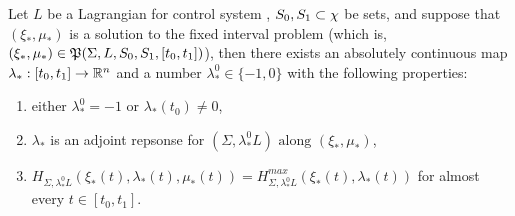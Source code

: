 \begin{teo}
	Let $L$ be a Lagrangian for control system \controlSystem, $S_0,S_1\subset\chi$ be sets, and suppose that $(\xi_*,\mu_*)$ is a solution to the fixed interval problem (which is, $(\xi_*,\mu_*)\in\mathfrak{P}(\Sigma,L,S_0,S_1,[t_0,t_1])$), then there exists an absolutely continuous map $\lambda_*:[t_0,t_1]\rightarrow\mathbb{R}^n$ and a number $\lambda_*^0\in\{-1,0\}$ with the following properties:
\begin{enumerate}
	\item either $\lambda_*^0=-1$ or $\lambda_*(t_0)\ne0$,
	\item $\lambda_*$ is an adjoint repsonse for $(\Sigma,\lambda_*^0L)\text{ along }(\xi_*,\mu_*)$,
	\item $H_{\Sigma,\lambda_*^0L}(\xi_*(t),\lambda_*(t),\mu_*(t))=H_{\Sigma,\lambda_*^0L}^{max}(\xi_*(t),\lambda_*(t))$ for almost every $t\in[t_0,t_1]$.
\end{enumerate}
	\label{6-3}
\end{teo}

